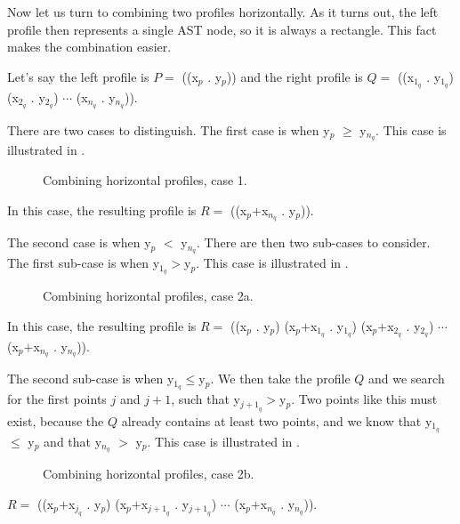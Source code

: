 Now let us turn to combining two profiles horizontally.  As it turns
out, the left profile then represents a single AST node, so it is
always a rectangle.  This fact makes the combination easier.

Let's say the left profile is $P = $ ((x$_p$ . y$_p$)) and the right
profile is $Q = $ ((x$_{1_q}$ . y$_{1_q}$) (x$_{2_q}$ . y$_{2_q}$)
$\cdots$ (x$_{n_q}$ . y$_{n_q}$)).

There are two cases to distinguish.  The first case is when y$_p$ $\ge$
y$_{n_q}$.  This case is illustrated in
.

\begin{figure}
\begin{center}
\end{center}
\caption{\label{fig-profile-horizontal-case-1}
Combining horizontal profiles, case 1.}
\end{figure}

In this case, the resulting profile is $R = $ ((x$_p$$+$x$_{n_q}$ . y$_p$)).

The second case is when y$_p$ $<$ y$_{n_q}$.  There are then two
sub-cases to consider.  The first sub-case is when y$_{1_q}$$>$y$_p$.
This case is illustrated in .

\begin{figure}
\begin{center}
\end{center}
\caption{\label{fig-profile-horizontal-case-2a}
Combining horizontal profiles, case 2a.}
\end{figure}

In this case, the resulting profile is $R = $ ((x$_p$ . y$_p$)
(x$_p$$+$x$_{1_q}$ . y$_{1_q}$) (x$_p$$+$x$_{2_q}$ . y$_{2_q}$)
$\cdots$ (x$_p$$+$x$_{n_q}$ . y$_{n_q}$)).

The second sub-case is when y$_{1_q}$$\le$y$_p$.  We then take the
profile $Q$ and we search for the first points $j$ and $j+1$, such
that y$_{{j+1}_q}$$>$y$_p$.  Two points like this must exist, because
the $Q$ already contains at least two points, and we know that
y$_{1_q}$ $\le$ y$_p$ and that y$_{n_q}$ $>$ y$_p$.
This case is illustrated in .

\begin{figure}
\begin{center}
\end{center}
\caption{\label{fig-profile-horizontal-case-2b}
Combining horizontal profiles, case 2b.}
\end{figure}

$R = $ ((x$_p$$+$x$_{j_q}$ . y$_p$)
(x$_p$$+$x$_{{j+1}_q}$ . y$_{{j+1}_q}$)
$\cdots$ (x$_p$$+$x$_{n_q}$ . y$_{n_q}$)).
